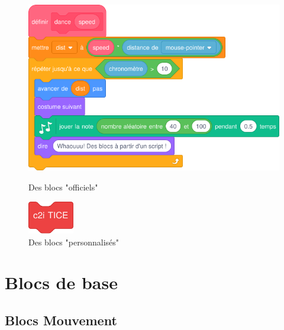 \documentclass[french,10pt]{article}
\begin{document}
\begin{figure}[h]
    \begin{minipage}[t]{0.45\linewidth}
        \centering
        \includegraphics[width=\linewidth]{res/01_exemple.png}
        \caption{Des blocs "officiels"}
        \label{}
    \end{minipage}
    \hfill
    \begin{minipage}[t]{0.45\linewidth}
        \centering
        \includegraphics[width=2cm]{res/fig-c2i-scratch}
        \caption{Des blocs "personnalisés"}
        \label{}
    \end{minipage}
\end{figure}


\newpage
\section{Blocs de base}

\pagestyle{scratch}




\subsection{Blocs Mouvement}
\end{document}
